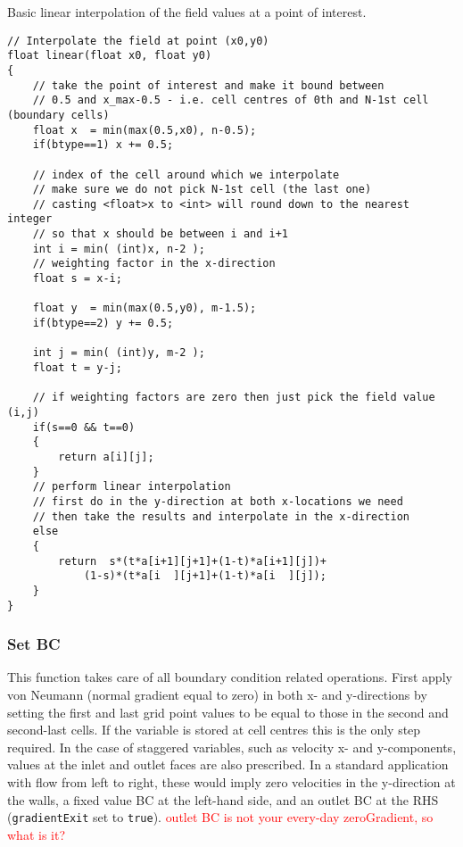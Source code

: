\documentclass[notitlepage]{article}
\begin{document}
Basic linear interpolation of the field values at a point of interest.

\begin{lstlisting}[style=myCpp]
// Interpolate the field at point (x0,y0)
float linear(float x0, float y0)
{
	// take the point of interest and make it bound between
	// 0.5 and x_max-0.5 - i.e. cell centres of 0th and N-1st cell (boundary cells)
	float x  = min(max(0.5,x0), n-0.5);
	if(btype==1) x += 0.5;
	
	// index of the cell around which we interpolate
	// make sure we do not pick N-1st cell (the last one)
	// casting <float>x to <int> will round down to the nearest integer
	// so that x should be between i and i+1
	int i = min( (int)x, n-2 ); 
	// weighting factor in the x-direction
	float s = x-i;
	
	float y  = min(max(0.5,y0), m-1.5);
	if(btype==2) y += 0.5;
	
	int j = min( (int)y, m-2 );
	float t = y-j;
	
	// if weighting factors are zero then just pick the field value (i,j)
	if(s==0 && t==0)
	{
		return a[i][j];
	}
	// perform linear interpolation
	// first do in the y-direction at both x-locations we need
	// then take the results and interpolate in the x-direction
	else
	{
		return  s*(t*a[i+1][j+1]+(1-t)*a[i+1][j])+
			(1-s)*(t*a[i  ][j+1]+(1-t)*a[i  ][j]);
	}
}
\end{lstlisting}

\subsubsection{Set BC}

This function takes care of all boundary condition related operations.
First apply von Neumann (normal gradient equal to zero) in both
x- and y-directions by setting the first and last grid point values to be equal to
those in the second and second-last cells. If the variable is stored at cell centres this is the only
step required. In the case of staggered variables, such as velocity x- and y-components, values
at the inlet and outlet faces are also prescribed. In a standard application with flow from left to right,
these would imply zero velocities in the y-direction at the walls, a fixed value BC at the left-hand side,
and an outlet BC at the RHS (\texttt{gradientExit} set to \texttt{true}).
\textcolor{red}{outlet BC is not your every-day zeroGradient, so what is it?}
\end{document}
